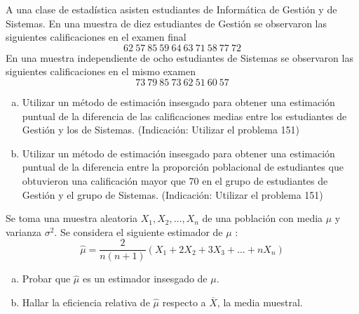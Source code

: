 \documentclass[12pt]{article}
\begin{document}
    \begin{prob}
        A una clase de estadística asisten estudiantes de Informática de Gestión y de
        Sistemas. En una muestra de
         diez estudiantes de Gestión  se observaron las
         siguientes calificaciones en el examen final
         $$62 \ 57 \ 85 \ 59\ 64\ 63\ 71\ 58\ 77\ 72$$
         En una muestra independiente de ocho estudiantes de Sistemas se
         observaron las siguientes calificaciones en el mismo examen
         $$73 \ 79 \ 85 \ 73\ 62\ 51\ 60\ 57$$
         \begin{enumerate}[a)]
             \item Utilizar un método de estimación insesgado para
             obtener una estimación puntual de la diferencia de las
             calificaciones medias entre los estudiantes de Gestión y
             los de Sistemas. (Indicación: Utilizar el problema 151)
             \item Utilizar un método de estimación insesgado para obtener una
             estimación puntual de la diferencia entre la proporción poblacional de
             estudiantes que obtuvieron una calificación  mayor que 70 en el
             grupo de estudiantes de Gestión y el grupo de Sistemas.
               (Indicación: Utilizar el problema 151)
             \end{enumerate}
        \end{prob}
    \begin{prob}
Se toma una muestra aleatoria $X_{1},X_{2},\ldots,X_{n}$  de una población con media $\mu$
y varianza $\sigma^2$. Se considera el siguiente estimador de $\mu$ :
$$\hat{\mu}=\frac{2}{n(n+1)}(X_{1}+2X_{2}+3X_{3}+\ldots+nX_{n})$$
\begin{enumerate}[a)]
    \item Probar que $\hat{\mu}$ es un estimador insesgado de $\mu$.
    \item Hallar la eficiencia relativa de $\hat{\mu}$  respecto a
    $\overline{X}$, la media muestral.
    \end{enumerate}
        \end{prob}
\end{document}
